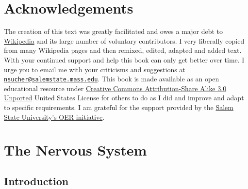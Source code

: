 



\frontmatter

\setcounter{page}{-1}


\maketitle

\setcounter{tocdepth}{1}
\tableofcontents

\clearpage

\listoftables
\listoffigures


\hypertarget{acknowledgements}{%
\chapter*{Acknowledgements}\label{acknowledgements}}

The creation of this text was greatly facilitated and owes a major debt to \href{https://www.wikipedia.org}{Wikipedia} and its large number of voluntary contributors. I very liberally copied from many Wikipedia pages and then remixed, edited, adapted and added text. With your continued support and help this book can only get better over time. I urge you to email me with your criticisms and suggestions at \href{mailto:nsucher@salemstate.mass.edu}{\nolinkurl{nsucher@salemstate.mass.edu}}. This book is made available as an open educational resource under \href{https://creativecommons.org/licenses/by-sa/3.0/deed.en}{Creative Commons Attribution-Share Alike 3.0 Unported} United States License for others to do as I did and improve and adapt to specific requirements. I am grateful for the support provided by the \href{}{Salem State University's OER initiative}.

\mainmatter

\hypertarget{the-nervous-system}{%
\chapter{The Nervous System}\label{the-nervous-system}}

\hypertarget{introduction}{%
\section{Introduction}\label{introduction}}

